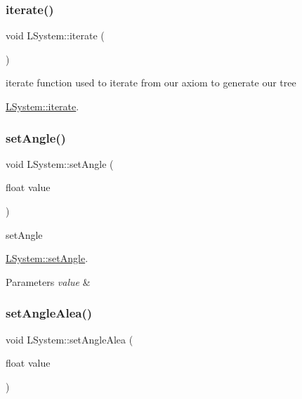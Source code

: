 \subsubsection{\texorpdfstring{iterate()}{iterate()}}
{\footnotesize\ttfamily void L\+System\+::iterate (\begin{DoxyParamCaption}{ }\end{DoxyParamCaption})}



iterate function used to iterate from our axiom to generate our tree 

\hyperlink{classLSystem_a75600a935cbd5bbdcb27168489657f48}{L\+System\+::iterate}. \mbox{\label{classLSystem_a9669053a1e08edfd525b933a99ab528d}} 
\subsubsection{\texorpdfstring{set\+Angle()}{setAngle()}}
{\footnotesize\ttfamily void L\+System\+::set\+Angle (\begin{DoxyParamCaption}\item[{float}]{value }\end{DoxyParamCaption})}



set\+Angle 

\hyperlink{classLSystem_a9669053a1e08edfd525b933a99ab528d}{L\+System\+::set\+Angle}.


\begin{DoxyParams}{Parameters}
{\em value} & \\
\hline
\end{DoxyParams}
\mbox{\label{classLSystem_ad05d5d24fdbe1ac6496bf5d9733a4702}} 
\subsubsection{\texorpdfstring{set\+Angle\+Alea()}{setAngleAlea()}}
{\footnotesize\ttfamily void L\+System\+::set\+Angle\+Alea (\begin{DoxyParamCaption}\item[{float}]{value }\end{DoxyParamCaption})}



